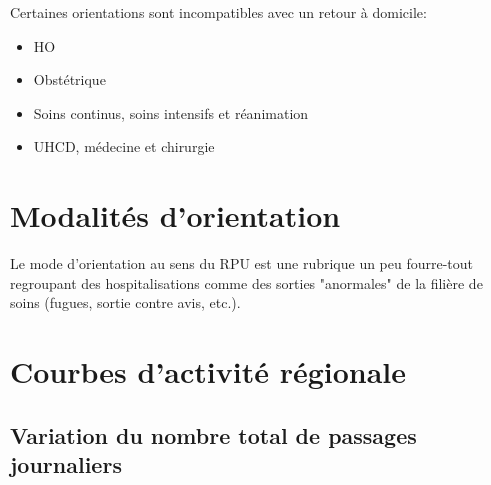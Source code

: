\documentclass[12pt,english,french,twoside]{book}\usepackage[]{graphicx}\usepackage[]{color}
\begin{document}
Certaines orientations sont incompatibles avec un retour à domicile:
\begin{itemize}
  \item HO
  \item Obstétrique
  \item Soins continus, soins intensifs et réanimation
  \item UHCD, médecine et chirurgie
  
\end{itemize}



\newpage
\chapter{Modalités d'orientation}



Le mode d'orientation au sens du RPU est une rubrique un peu fourre-tout regroupant des hospitalisations comme des sorties "anormales" de la filière de soins (fugues, sortie contre avis, etc.).

\newpage
\chapter{Courbes d'activité régionale}

 

\section{Variation du nombre total de passages journaliers}
\end{document}
